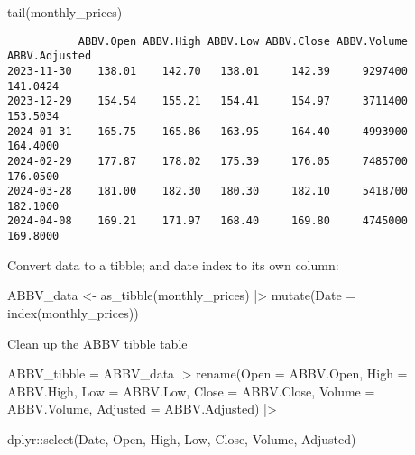 \documentclass[
  letterpaper,
  DIV=11,
  numbers=noendperiod]{scrartcl}
\newenvironment{Shaded}{\begin{snugshade}}{\end{snugshade}}
\newcommand{\AttributeTok}[1]{\textcolor[rgb]{0.40,0.45,0.13}{#1}}
\newcommand{\FunctionTok}[1]{\textcolor[rgb]{0.28,0.35,0.67}{#1}}
\newcommand{\NormalTok}[1]{\textcolor[rgb]{0.00,0.23,0.31}{#1}}
\newcommand{\OtherTok}[1]{\textcolor[rgb]{0.00,0.23,0.31}{#1}}
\newcommand{\SpecialCharTok}[1]{\textcolor[rgb]{0.37,0.37,0.37}{#1}}
\begin{document}
\begin{Shaded}
\begin{Highlighting}[]
\FunctionTok{tail}\NormalTok{(monthly\_prices) }
\end{Highlighting}
\end{Shaded}

\begin{verbatim}
           ABBV.Open ABBV.High ABBV.Low ABBV.Close ABBV.Volume ABBV.Adjusted
2023-11-30    138.01    142.70   138.01     142.39     9297400      141.0424
2023-12-29    154.54    155.21   154.41     154.97     3711400      153.5034
2024-01-31    165.75    165.86   163.95     164.40     4993900      164.4000
2024-02-29    177.87    178.02   175.39     176.05     7485700      176.0500
2024-03-28    181.00    182.30   180.30     182.10     5418700      182.1000
2024-04-08    169.21    171.97   168.40     169.80     4745000      169.8000
\end{verbatim}

Convert data to a tibble; and date index to its own column:

\begin{Shaded}
\begin{Highlighting}[]
\NormalTok{ABBV\_data }\OtherTok{\textless{}{-}} \FunctionTok{as\_tibble}\NormalTok{(monthly\_prices) }\SpecialCharTok{|\textgreater{}}
  \FunctionTok{mutate}\NormalTok{(}\AttributeTok{Date =} \FunctionTok{index}\NormalTok{(monthly\_prices))}
\end{Highlighting}
\end{Shaded}

Clean up the ABBV tibble table

\begin{Shaded}
\begin{Highlighting}[]
\NormalTok{ABBV\_tibble }\OtherTok{=}\NormalTok{ ABBV\_data }\SpecialCharTok{|\textgreater{}}
  \FunctionTok{rename}\NormalTok{(}\AttributeTok{Open =}\NormalTok{ ABBV.Open,}
        \AttributeTok{High =}\NormalTok{ ABBV.High,}
        \AttributeTok{Low =}\NormalTok{ ABBV.Low,}
        \AttributeTok{Close =}\NormalTok{ ABBV.Close,}
        \AttributeTok{Volume =}\NormalTok{ ABBV.Volume,}
        \AttributeTok{Adjusted =}\NormalTok{ ABBV.Adjusted) }\SpecialCharTok{|\textgreater{}}

\NormalTok{dplyr}\SpecialCharTok{::}\FunctionTok{select}\NormalTok{(Date, Open, High, Low, Close, Volume, Adjusted)}
\end{Highlighting}
\end{Shaded}
\end{document}
